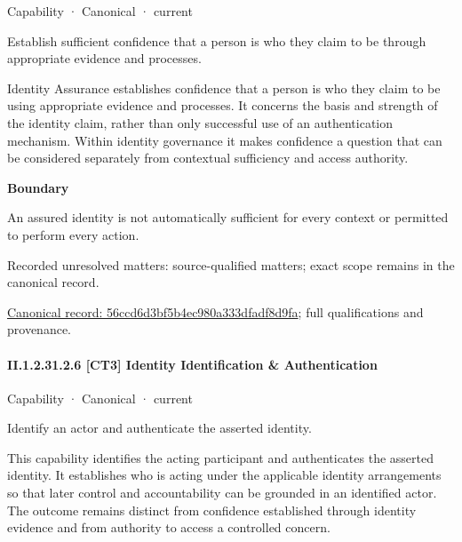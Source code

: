 \label{element:56ccd6d3bf5b4ec980a333dfadf8d9fa}
{\small Capability · Canonical · current}\par

Establish sufficient confidence that a person is who they claim to be through appropriate evidence and processes.



Identity Assurance establishes confidence that a person is who they claim to be using appropriate evidence and processes. It concerns the basis and strength of the identity claim, rather than only successful use of an authentication mechanism. Within identity governance it makes confidence a question that can be considered separately from contextual sufficiency and access authority.



\textbf{Boundary}



An assured identity is not automatically sufficient for every context or permitted to perform every action.


{\small Recorded unresolved matters: source-qualified matters; exact scope remains in the canonical record.}\par
{\footnotesize \href{../../../../continuum/strategy/capability/56ccd6d3bf5b4ec980a333dfadf8d9fa.md}{Canonical record: 56ccd6d3bf5b4ec980a333dfadf8d9fa}; full qualifications and provenance.}\par
\paragraph*{II.1.2.31.2.6 [CT3] Identity Identification \& Authentication}
\label{navigation:II.1.2.31.2.6}

\label{element:ba4ad62548984d63ad75da3561566431}
{\small Capability · Canonical · current}\par

Identify an actor and authenticate the asserted identity.



This capability identifies the acting participant and authenticates the asserted identity. It establishes who is acting under the applicable identity arrangements so that later control and accountability can be grounded in an identified actor. The outcome remains distinct from confidence established through identity evidence and from authority to access a controlled concern.



